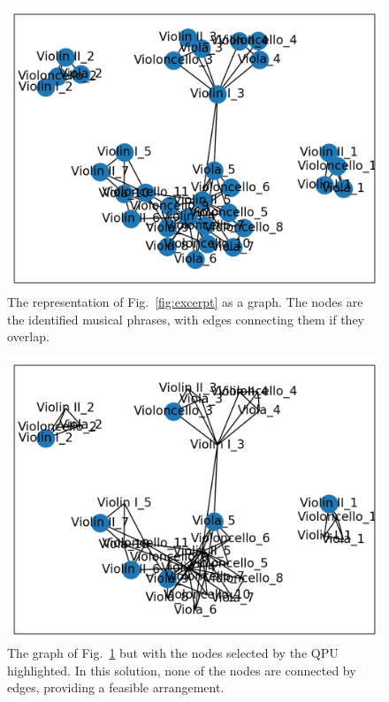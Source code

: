 \documentclass[aps,pra,10pt,twocolumn]{revtex4-2}
\begin{document}
\begin{figure}[h]
    \centering
    \includegraphics[width=\linewidth]{../Trials/1_graph.png}
    \caption{The representation of Fig.\ \ref{fig:excerpt} as a graph. The nodes are the identified musical phrases, with edges connecting them if they overlap.}
    \label{fig:graph}
\end{figure}

\begin{figure}[h]
    \centering
    \includegraphics[width=\linewidth]{../Trials/1_solution.png}
    \caption{The graph of Fig.\ \ref{fig:graph} but with the nodes selected by the QPU highlighted. In this solution, none of the nodes are connected by edges, providing a feasible arrangement.}
    \label{fig:solution}
\end{figure}
\end{document}
